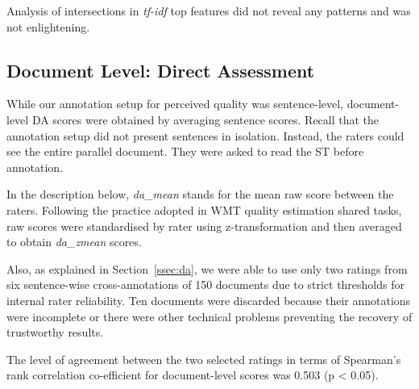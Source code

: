 Analysis of intersections in \textit{tf-idf} top features did not reveal any patterns and was not enlightening. 



\subsection{\label{ssec:doc_da_res}Document Level: Direct Assessment}
While our annotation setup for perceived quality was sentence-level, document-level DA scores were obtained by averaging sentence scores. Recall that the annotation setup did not present sentences in isolation. Instead, the raters could see the entire parallel document. They were asked to read the ST before annotation. 

In the description below, \textit{da\_mean} stands for the mean raw score between the raters. 
Following the practice adopted in \gls{WMT} quality estimation shared tasks, raw scores were standardised by rater using z-transformation and then averaged to obtain \textit{da\_zmean} scores. %

Also, as explained in Section~\ref{ssec:da}, we were able to use only two ratings from six sentence-wise cross-annotations of 150 documents due to strict thresholds for internal rater reliability. Ten documents were discarded because their annotations were incomplete or there were other technical problems preventing the recovery of trustworthy results. 

The level of agreement between the two selected ratings in terms of Spearman's rank correlation co-efficient for document-level scores was 0.503 (p < 0.05). %

